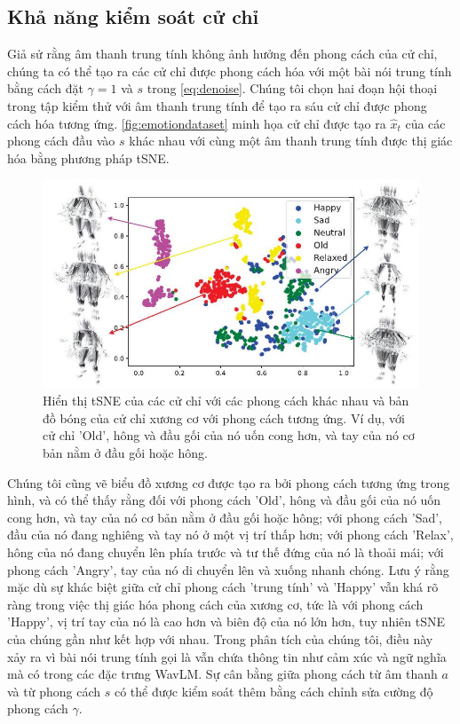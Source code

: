 
\subsection{Khả năng kiểm soát cử chỉ}
\label{subsec:stylecontrol}

Giả sử rằng âm thanh trung tính không ảnh hưởng đến phong cách của cử chỉ, chúng ta có thể tạo ra các cử chỉ được phong cách hóa với một bài nói trung tính bằng cách đặt $\gamma=1$ và $s$ trong \autoref{eq:denoise}. Chúng tôi chọn hai đoạn hội thoại trong tập kiểm thử với âm thanh trung tính để tạo ra sáu cử chỉ được phong cách hóa tương ứng. \autoref{fig:emotiondataset} minh họa cử chỉ được tạo ra $\hat{x}_{t}$ của các phong cách đầu vào $s$ khác nhau với cùng một âm thanh trung tính được thị giác hóa bằng phương pháp tSNE.

\begin{figure}
    \centering
    \includegraphics[width=0.7\linewidth]{images/emotion_dataset.jpg}
    \caption[Biểu đồ tSNE với các phong cách khác nhau]{Hiển thị tSNE của các cử chỉ với các phong cách khác nhau và bản đồ bóng của cử chỉ xương cơ với phong cách tương ứng. Ví dụ, với cử chỉ 'Old', hông và đầu gối của nó uốn cong hơn, và tay của nó cơ bản nằm ở đầu gối hoặc hông.}
    \label{fig:emotiondataset}
\end{figure}

Chúng tôi cũng vẽ biểu đồ xương cơ được tạo ra bởi phong cách tương ứng trong hình, và có thể thấy rằng đối với phong cách 'Old', hông và đầu gối của nó uốn cong hơn, và tay của nó cơ bản nằm ở đầu gối hoặc hông; với phong cách 'Sad', đầu của nó đang nghiêng và tay nó ở một vị trí thấp hơn; với phong cách 'Relax', hông của nó đang chuyển lên phía trước và tư thế đứng của nó là thoải mái; với phong cách 'Angry', tay của nó di chuyển lên và xuống nhanh chóng. Lưu ý rằng mặc dù sự khác biệt giữa cử chỉ phong cách 'trung tính' và 'Happy' vẫn khá rõ ràng trong việc thị giác hóa phong cách của xương cơ, tức là với phong cách 'Happy', vị trí tay của nó là cao hơn và biên độ của nó lớn hơn, tuy nhiên tSNE của chúng gần như kết hợp với nhau. Trong phân tích của chúng tôi, điều này xảy ra vì bài nói trung tính gọi là vẫn chứa thông tin như cảm xúc và ngữ nghĩa mà có trong các đặc trưng WavLM. Sự cân bằng giữa phong cách từ âm thanh $a$ và từ phong cách $s$ có thể được kiểm soát thêm bằng cách chỉnh sửa cường độ phong cách $\gamma$.

